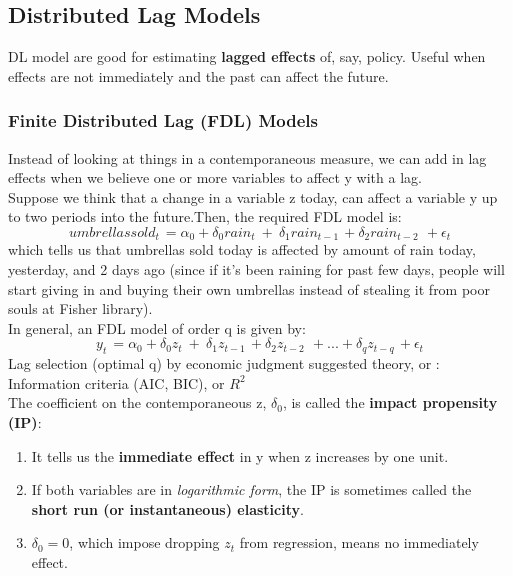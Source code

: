 \documentclass[12pt]{article}
\begin{document}
\newpage
{\color{RoyalBlue}
\subsection{Distributed Lag Models}}
DL model are good for estimating \textbf{lagged effects} of, say, policy.
Useful when effects are not immediately and the past can affect the future.
\\


{\color{RoyalBlue}
\subsubsection{Finite Distributed Lag (FDL) Models}}
Instead of looking at things in a contemporaneous measure, we can add in lag effects when we believe one or more variables to affect y with a lag.
\\

Suppose we think that a change in a variable z today, can affect a variable y up to two periods into the future.Then, the required FDL model is:
\begin{equation}
 umbrellassold_{t\ }=\alpha_0+\delta_0rain_t\ +\ \delta_1rain_{t-1\ }+\delta_2rain_{t-2\ }\ +\epsilon_t
\end{equation}
which tells us that umbrellas sold today is affected by amount of rain today, yesterday, and 2 days ago (since if it’s been raining for past few days, people will start giving in and buying their own umbrellas instead of stealing it from poor souls at Fisher library).
\\

\noindent
In general, an FDL model of order q is given by:
\begin{equation}
y_{t\ }=\alpha_0+\delta_0z_t\ +\ \delta_1z_{t-1\ }+\delta_2z_{t-2\ }\ +...+\delta_qz_{t-q\ }+\epsilon_t
\end{equation}
Lag selection (optimal q) by economic judgment suggested theory, or : Information criteria (AIC, BIC), or $R^2$
\\

\noindent
The coefficient on the contemporaneous z, $\delta_0$, is called the \textbf{impact propensity (IP)}:\\
\begin{enumerate}
\item It tells us the \textbf{immediate effect} in y when z increases by one unit.
\item If both variables are in \textit{logarithmic form}, the IP is sometimes called
the \textbf{short run (or instantaneous) elasticity}.
\item $\delta_0 = 0$, which impose dropping $z_t$ from regression, means no immediately effect. 
\end{enumerate}
\end{document}
